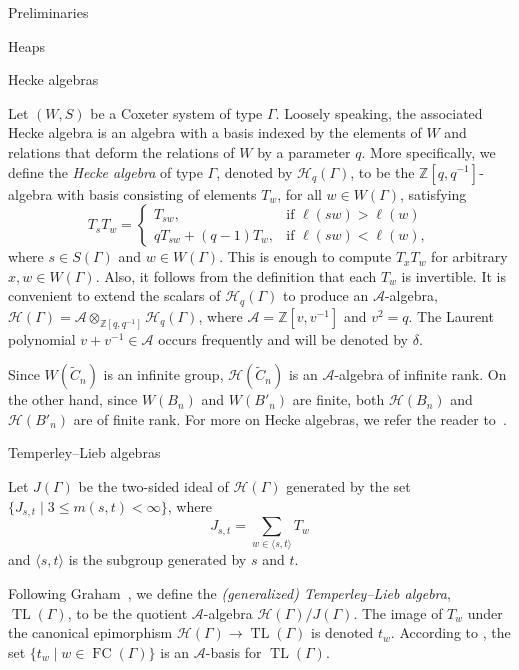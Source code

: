 \documentclass[11pt]{amsart}
\theoremstyle{definition}
\numberwithin{equation}{section}
\newcommand{\Z}{\mathbb{Z}}
\newcommand{\A}{\mathcal{A}}
\newcommand{\C}{\widetilde{C}}
\DeclareMathOperator{\TL}{TL}
\renewcommand{\(}{\left(}
\renewcommand{\)}{\right)}
\renewcommand{\H}{\mathcal{H}}
\DeclareMathOperator{\FC}{FC}
\begin{document}
\begin{section}{Preliminaries}
\begin{subsection}{Heaps}
\end{subsection}


\begin{subsection}{Hecke algebras}

Let $(W,S)$ be a Coxeter system of type $\Gamma$.  Loosely speaking, the associated Hecke algebra is an algebra with a basis indexed by the elements of $W$ and relations that deform the relations of $W$ by a parameter $q$.  More specifically, we define the \emph{Hecke algebra} of type $\Gamma$, denoted by $\H_{q}(\Gamma)$, to be the $\Z[q,q^{-1}]$-algebra with basis consisting of elements $T_{w}$, for all $w \in W(\Gamma)$, satisfying
\[
T_{s}T_{w}=\begin{cases}
T_{sw},  & \text{if } \ell(sw)>\ell(w)\\
qT_{sw}+(q-1)T_{w},  & \text{if } \ell(sw)<\ell(w),
\end{cases}
\]
where $s \in S(\Gamma)$ and $w \in W(\Gamma)$.  This is enough to compute $T_{x}T_{w}$ for arbitrary $x, w \in W(\Gamma)$.  Also, it follows from the definition that each $T_{w}$ is invertible.  It is convenient to extend the scalars of $\H_{q}(\Gamma)$ to produce an $\A$-algebra, $\H(\Gamma)=\A \otimes_{\Z[q,q^{-1}]} \H_{q}(\Gamma)$, where $\A=\Z[v,v^{-1}]$ and $v^{2}=q$.  The Laurent polynomial $v+v^{-1} \in \A$ occurs frequently and will be denoted by $\delta$.  

Since $W(\C_{n})$ is an infinite group, $\H(\C_{n})$ is an $\A$-algebra of infinite rank.  On the other hand, since $W(B_{n})$ and $W(B'_{n})$ are finite, both $\H(B_{n})$ and $\H(B'_{n})$ are of finite rank. For more on Hecke algebras, we refer the reader to~\cite[Chapter 7]{Humphreys1990}.

\end{subsection}


\begin{subsection}{Temperley--Lieb algebras}\label{subsec:TL-algebras}

Let $J(\Gamma)$ be the two-sided ideal of $\H(\Gamma)$ generated by the set $\{J_{s,t}\mid 3\leq m(s,t)<\infty\}$, where
\[
J_{s,t}=\sum_{w \in \langle s, t \rangle}T_{w}
\]
and $\langle s, t \rangle$ is the subgroup generated by $s$ and $t$.

Following Graham~\cite[Definition 6.1]{Graham1995}, we define the \emph{(generalized) Temperley--Lieb algebra}, $\TL(\Gamma)$, to be the quotient $\A$-algebra $\H(\Gamma)/J(\Gamma)$.  The image of $T_w$ under the canonical epimorphism $\H(\Gamma) \to \TL(\Gamma)$ is denoted $t_w$.  According to \cite[Theorem 6.2]{Graham1995}, the set $\{t_{w}\mid w \in \FC(\Gamma)\}$ is an $\A$-basis for $\TL(\Gamma)$.  


\end{subsection}
\end{section}
\end{document}
